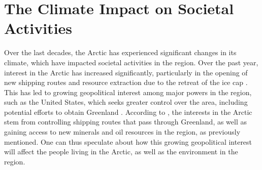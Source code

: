 \section{The Climate Impact on Societal Activities}
Over the last decades, the Arctic has experienced significant changes in its climate, which have impacted societal activities in the region. Over the past year, interest in the Arctic has increased significantly, particularly in the opening of new shipping routes and resource extraction due to the retreat of the ice cap \citep{mager2009}. This has led to growing geopolitical interest among major powers in the region, such as the United States, which seeks greater control over the area, including potential efforts to obtain Greenland \citep{CongressionalResearchService2026}. According to \citet{CongressionalResearchService2026}, the interests in the Arctic stem from controlling shipping routes that pass through Greenland, as well as gaining access to new minerals and oil resources in the region, as previously mentioned. One can thus speculate about how this growing geopolitical interest will affect the people living in the Arctic, as well as the environment in the region.
